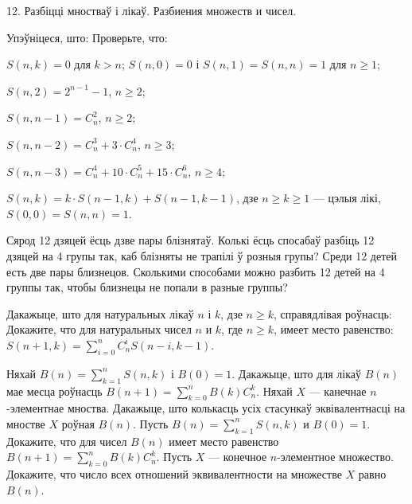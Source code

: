 



\biLangHeader
{12. Разбіцці мностваў і лікаў.}
{Разбиения множеств и чисел.}

\begin{problemList}

\problemItemWithCommonPart
{Упэўніцеся, што:}
{Проверьте, что:}
{\begin{belarusianEnumerate}
  \item $S(n, k) = 0$ для $k > n$; $S(n, 0) = 0$ і $S(n, 1) = S(n, n) = 1$ для $n \ge 1$;
  \item $S(n, 2) = 2^{n - 1} - 1$, $n \ge 2$;
  \item $S(n, n - 1) = C_n^2$, $n \ge 2$;
  \item $S(n, n - 2) = C_n^3 + 3 \cdot C_n^4$, $n \ge 3$;
  \item $S(n, n - 3) = C_n^4 + 10 \cdot C_n^5 + 15 \cdot C_n^6$, $n \ge 4$;
  \item $S(n, k) = k \cdot S(n - 1, k) + S(n - 1, k - 1)$, дзе $n \ge k \ge 1$ --- цэлыя лікі,
  $S(0, 0) = S(n, n) = 1$.
\end{belarusianEnumerate}}

\bigskip

\problemItemSimple
{Сярод 12 дзяцей ёсць дзве пары блізнятаў. Колькі ёсць спосабаў разбіць 12 дзяцей
на 4 групы так, каб блізняты не трапілі ў розныя групы?}
{Среди 12 детей есть две пары близнецов. Сколькими способами можно разбить
12 детей на 4 группы так, чтобы близнецы не попали в разные группы?}

\bigskip

\problemItemWithCommonPart
{Дакажыце, што для натуральных лікаў $n$ і $k$, дзе $n \ge k$,
справядлівая роўнасць:}
{Докажите, что для натуральных чисел $n$ и $k$, где $n \ge k$,
имеет место равенство:}
{$S(n + 1, k) = \sum\limits_{i = 0}^n C_n^i S(n - i, k - 1)$.}

\bigskip

\problemItemSimple
{Няхай $B(n) = \sum\limits_{k = 1}^n S(n, k)$ і $B(0) = 1$. Дакажыце,
што для лікаў $B(n)$ мае месца роўнасць $B(n + 1) = \sum\limits_{k = 0}^n B(k)C_n^k$.
Няхай $X$ --- канечнае $n$-элементнае мноства. Дакажыце, што колькасць усіх
стасункаў эквівалентнасці на мностве $X$ роўная $B(n)$.}
{Пусть $B(n) = \sum\limits_{k = 1}^n S(n, k)$ и $B(0) = 1$. Докажите,
что для чисел $B(n)$ имеет место равенство $B(n + 1) = \sum\limits_{k = 0}^n B(k)C_n^k$.
Пусть $X$ --- конечное $n$-элементное множество. Докажите, что число всех
отношений эквивалентности на множестве $X$ равно $B(n)$.}


\end{problemList}
